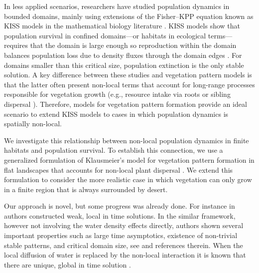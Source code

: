 \documentclass[11pt, a4paper]{article}
\providecommand{\MT}[1]{\todo[inline,author={MT},color=blue!20!white]{#1}}
\theoremstyle{break}
\theoremstyle{break}
\theoremstyle{break}
\theoremstyle{break}
\theoremstyle{break}
\theoremstyle{break}
\theoremstyle{break}
\theoremstyle{break}
\theoremstyle{break}
\begin{document}
In less applied scenarios, researchers have studied population dynamics in bounded domains, mainly using extensions of the Fisher–KPP equation \cite{Cantrell1999,Fagan2009,Colombo2018,Dornelas2024} known as KISS models in the mathematical biology literature \cite{Skellam1951, Kierstead1953}. KISS models show that population survival in confined domains---or habitats in ecological terms--- requires that the domain is large enough so reproduction within the domain balances population loss due to density fluxes through the domain edges \cite{Cantrell2004}. For domains smaller than this critical size, population extinction is the only stable solution. A key difference between these studies and vegetation pattern models is that the latter often present non-local terms that account for long-range processes responsible for vegetation growth (e.g., resource intake via roots or sibling dispersal \cite{Martinez-Garcia2014,Eigentler2018}). Therefore, models for vegetation pattern formation provide an ideal scenario to extend KISS models to cases in which population dynamics is spatially non-local. 

We investigate this relationship between non-local population dynamics in finite habitats and population survival. To establish this connection, we use a generalized formulation of Klausmeier's model for vegetation pattern formation in flat landscapes that accounts for non-local plant dispersal \cite{Eigentler2018,Klausmeier1999}. We extend this formulation to consider the more realistic case in which vegetation can only grow in a finite region that is always surrounded by desert. 

Our approach is novel, but some progress was already done. For instance in \cite{JaramilloMeraz2024, CappaneraJaramilloWard2024} authors constructed weak, local in time solutions. In the similar framework, however not involving the water density effects directly, authors shown several important properties such as large time asymptotics, existence of non-trivial stable patterns, and critical domain size, see \cite{Tadej2025, BaiLiWang2025, ReimerBonsallMaini2015, Sun2023} and references therein. When the local diffusion of water is replaced by the non-local interaction it is known that there are unique, global in time solution \cite{LaurencotWalker2023}.

\end{document}
